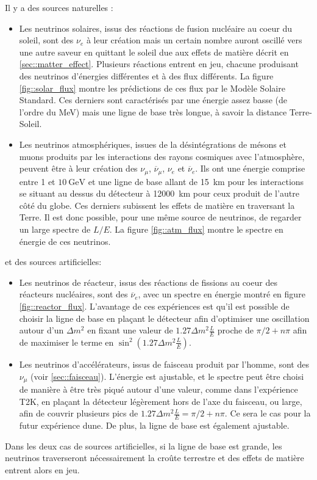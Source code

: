 		     Il y a des sources naturelles :
		    \begin{itemize}
		    	\item Les neutrinos solaires, issus des réactions de fusion nucléaire au coeur du soleil, sont des $\nu_e$ à leur création mais un certain nombre auront oscillé vers une autre saveur en quittant le soleil due aux effets de matière décrit en \autoref{sec::matter_effect}. Plusieurs réactions entrent en jeu, chacune produisant des neutrinos d'énergies différentes et à des flux différents. La figure \autoref{fig::solar_flux} montre les prédictions de ces flux par le Modèle Solaire Standard\cite{Haxton2013}. Ces derniers sont caractérisés par une énergie assez basse (de l'ordre du \si{\mega\electronvolt}) mais une ligne de base très longue, à savoir la distance Terre-Soleil.
		    	\item Les neutrinos atmosphériques, issues de la désintégrations de mésons et muons produits par les interactions des rayons cosmiques avec l'atmosphère, peuvent être à leur création des $\nu_{\mu}$, $\overline{\nu}_{\mu}$, $\nu_e$ et $\overline{\nu}_e$. Ils ont une énergie comprise entre 1 et $\SI{10}{\giga\electronvolt}$ et une ligne de base allant de \SI{15}{\kilo\meter} pour les interactions se situant au dessus du détecteur à \SI{12000}{\kilo\meter} pour ceux produit de l'autre côté du globe. Ces derniers subissent les effets de matière en traversant la Terre. Il est donc possible, pour une même source de neutrinos, de regarder un large spectre de $L/E$. La figure \autoref{fig::atm_flux} montre le spectre en énergie de ces neutrinos.
		    \end{itemize}
		    et des sources artificielles:
		    \begin{itemize}
		    	\item Les neutrinos de réacteur, issus des réactions de fissions au coeur des réacteurs nucléaires, sont des $\overline{\nu}_e$, avec un spectre en énergie montré en figure \autoref{fig::reactor_flux}. L'avantage de ces expériences est qu'il est possible de choisir la ligne de base en plaçant le détecteur afin d'optimiser une oscillation autour d'un $\Delta m^2$ en fixant une valeur de $1.27\Delta m^2\frac{L}{E}$ proche de $\pi/2+n\pi$ afin de maximiser le terme en $\sin^2(1.27\Delta m^2\frac{L}{E})$.
		    	\item Les neutrinos d'accélérateurs, issus de faisceau produit par l'homme, sont des $\nu_{\mu}$ (voir \autoref{sec::faisceau}). L'énergie est ajustable, et le spectre peut être choisi de manière à être très piqué autour d'une valeur, comme dans l'expérience T2K, en plaçant la détecteur légèrement hors de l'axe du faisceau\cite{McDonald2001}, ou large, afin de couvrir plusieurs pics de $1.27\Delta m^2\frac{L}{E}=\pi/2+n\pi$. Ce sera le cas pour la futur expérience \gls{dune}. De plus, la ligne de base est également ajustable.
		    \end{itemize}
		    Dans les deux cas de sources artificielles, si la ligne de base est grande, les neutrinos traverseront nécessairement la croûte terrestre et des effets de matière entrent alors en jeu.
		    
